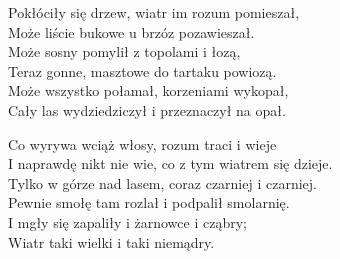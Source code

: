 \begin{text}
Pokłóciły się drzew, wiatr im rozum pomieszał,\\
Może liście bukowe u brzóz pozawieszał.\\
Może sosny pomylił z topolami i łozą,\\
Teraz gonne, masztowe do tartaku powiozą.\\
Może wszystko połamał, korzeniami wykopał,\\
Cały las wydziedziczył i przeznaczył na opał.

Co wyrywa wciąż włosy, rozum traci i wieje\\
I naprawdę nikt nie wie, co z tym wiatrem się dzieje.\\
Tylko w górze nad lasem, coraz czarniej i czarniej.\\
Pewnie smołę tam rozlał i podpalił smolarnię.\\
I mgły się zapaliły i żarnowce i cząbry;\\
Wiatr taki wielki i taki niemądry.
\end{text}